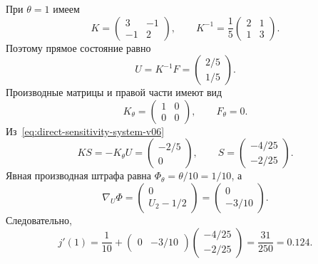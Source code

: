 При $\theta=1$ имеем
\[
 K=
 \begin{pmatrix}
 3&-1\\-1&2
 \end{pmatrix},
 \qquad
 K^{-1}
 =
 \frac15
 \begin{pmatrix}
 2&1\\1&3
 \end{pmatrix}.
\]
Поэтому прямое состояние равно
\begin{equation}
\label{eq:worked-state-v06}
 U
 =
 K^{-1}F
 =
 \begin{pmatrix}
 2/5\\1/5
 \end{pmatrix}.
\end{equation}
Производные матрицы и правой части имеют вид
\[
 K_\theta
 =
 \begin{pmatrix}
 1&0\\0&0
 \end{pmatrix},
 \qquad
 F_\theta=0.
\]
Из~\eqref{eq:direct-sensitivity-system-v06}
\begin{equation}
\label{eq:worked-direct-sensitivity-v06}
 KS
 =
 -K_\theta U
 =
 \begin{pmatrix}
 -2/5\\0
 \end{pmatrix},
 \qquad
 S
 =
 \begin{pmatrix}
 -4/25\\-2/25
 \end{pmatrix}.
\end{equation}
Явная производная штрафа равна $\Phi_\theta=\theta/10=1/10$, а
\[
 \nabla_U\Phi
 =
 \begin{pmatrix}
 0\\U_2-1/2
 \end{pmatrix}
 =
 \begin{pmatrix}
 0\\-3/10
 \end{pmatrix}.
\]
Следовательно,
\begin{equation}
\label{eq:worked-direct-gradient-v06}
 j'(1)
 =
 \frac1{10}
 +
 \begin{pmatrix}0&-3/10\end{pmatrix}
 \begin{pmatrix}-4/25\\-2/25\end{pmatrix}
 =
 \frac{31}{250}
 =0.124.
\end{equation}

